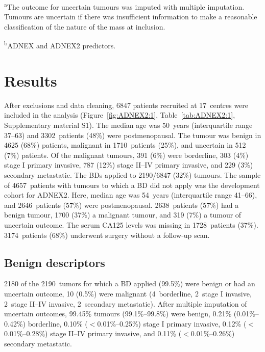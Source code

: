 \begin{table}
{\begin{minipage}[t]{\textwidth}
\textsuperscript{a}The outcome for uncertain tumours was imputed with multiple imputation. Tumours are uncertain if there was insufficient information to make a reasonable classification of the nature of the mass at inclusion.

\textsuperscript{b}ADNEX and ADNEX2 predictors.
\end{minipage}%
}
\end{table}

\section{Results}

After exclusions and data cleaning, 6847 patients recruited at 17~centres were included in the analysis (Figure~\ref{fig:ADNEX2:1}, Table~\ref{tab:ADNEX2:1}, Supplementary material S1). The median age was 50~years (interquartile range 37--63) and 3302~patients (48\%) were postmenopausal. The tumour was benign in 4625 (68\%) patients, malignant in 1710~patients (25\%), and uncertain in 512 (7\%) patients. Of the malignant tumours, 391 (6\%) were borderline, 303 (4\%) stage I primary invasive, 787 (12\%) stage II--IV primary invasive, and 229 (3\%) secondary metastatic. The \glspl{BD} applied to 2190/6847 (32\%) tumours. The sample of 4657~patients with tumours to which a \gls{BD} did not apply was the development cohort for ADNEX2. Here, median age was 54~years (interquartile range 41--66), and 2646~patients (57\%) were postmenopausal. 2638~patients (57\%) had a benign tumour, 1700 (37\%) a malignant tumour, and 319 (7\%) a tumour of uncertain outcome. The serum \gls{CA125} levels was missing in 1728~patients (37\%). 3174~patients (68\%) underwent surgery without a follow-up scan.

\subsection{Benign descriptors}

2180 of the 2190~tumors for which a \gls{BD} applied (99.5\%) were benign or had an uncertain outcome, 10 (0.5\%) were malignant (4~borderline, 2~stage I invasive, 2~stage II--IV invasive, 2~secondary metastatic). After multiple imputation of uncertain outcomes, 99.45\% tumours (99.1\%--99.8\%) were benign, 0.21\% (0.01\%--0.42\%) borderline, 0.10\% ($<$0.01\%--0.25\%) stage I primary invasive, 0.12\% ($<$0.01\%--0.28\%) stage II--IV primary invasive, and 0.11\% ($<$0.01\%--0.26\%) secondary metastatic.

